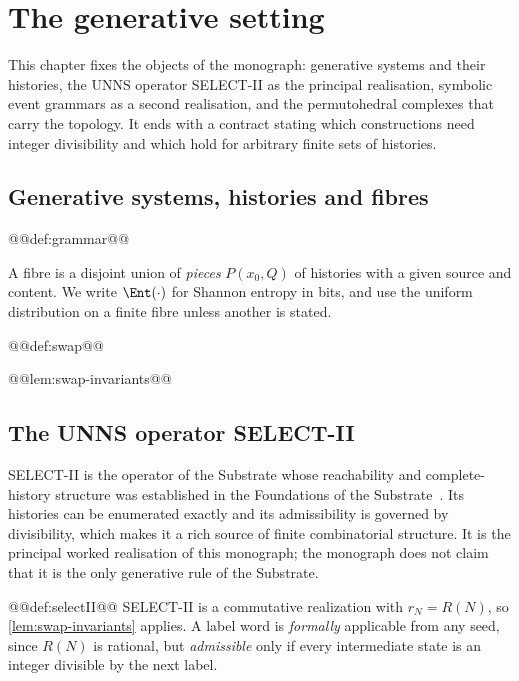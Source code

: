 \chapter{The generative setting}\label{ch:grammars}

This chapter fixes the objects of the monograph: generative systems and their histories, the UNNS operator SELECT-II as the principal realisation, symbolic event grammars as a second realisation, and the permutohedral complexes that carry the topology. It ends with a contract stating which constructions need integer divisibility and which hold for arbitrary finite sets of histories.

\section{Generative systems, histories and fibres}
@@def:grammar@@

A fibre is a disjoint union of \emph{pieces} $P(x_0,Q)$ of histories with a given source and content. We write $\Ent(\cdot)$ for Shannon entropy in bits, and use the uniform distribution on a finite fibre unless another is stated.

@@def:swap@@

@@lem:swap-invariants@@

\section{The UNNS operator SELECT-II}\label{sec:selectII}
SELECT-II is the operator of the Substrate whose reachability and complete-history structure was established in the Foundations of the Substrate~\cite{UNNSFound}. Its histories can be enumerated exactly and its admissibility is governed by divisibility, which makes it a rich source of finite combinatorial structure. It is the principal worked realisation of this monograph; the monograph does not claim that it is the only generative rule of the Substrate.

@@def:selectII@@
SELECT-II is a commutative realization with $r_N=R(N)$, so \cref{lem:swap-invariants} applies. A label word is \emph{formally} applicable from any seed, since $R(N)$ is rational, but \emph{admissible} only if every intermediate state is an integer divisible by the next label.

